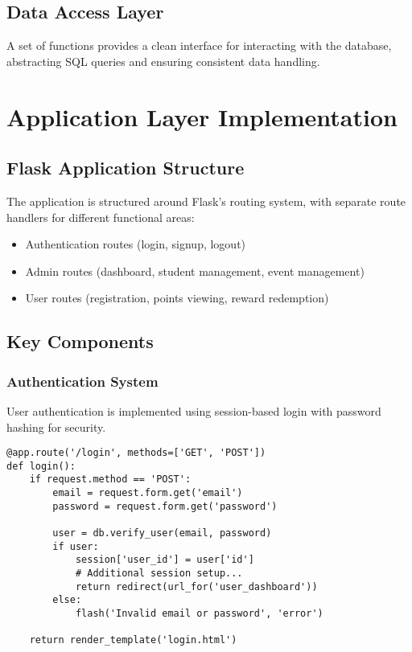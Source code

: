 \documentclass[12pt,a4paper]{report}
\begin{document}
\subsection{Data Access Layer}
A set of functions provides a clean interface for interacting with the database, abstracting SQL queries and ensuring consistent data handling.

\section{Application Layer Implementation}

\subsection{Flask Application Structure}
The application is structured around Flask's routing system, with separate route handlers for different functional areas:

\begin{itemize}
    \item Authentication routes (login, signup, logout)
    \item Admin routes (dashboard, student management, event management)
    \item User routes (registration, points viewing, reward redemption)
\end{itemize}

\subsection{Key Components}

\subsubsection{Authentication System}
User authentication is implemented using session-based login with password hashing for security.

\begin{lstlisting}[caption={Authentication Implementation}, label={lst:auth}]
@app.route('/login', methods=['GET', 'POST'])
def login():
    if request.method == 'POST':
        email = request.form.get('email')
        password = request.form.get('password')
        
        user = db.verify_user(email, password)
        if user:
            session['user_id'] = user['id']
            # Additional session setup...
            return redirect(url_for('user_dashboard'))
        else:
            flash('Invalid email or password', 'error')
    
    return render_template('login.html')
\end{lstlisting}
\end{document}

